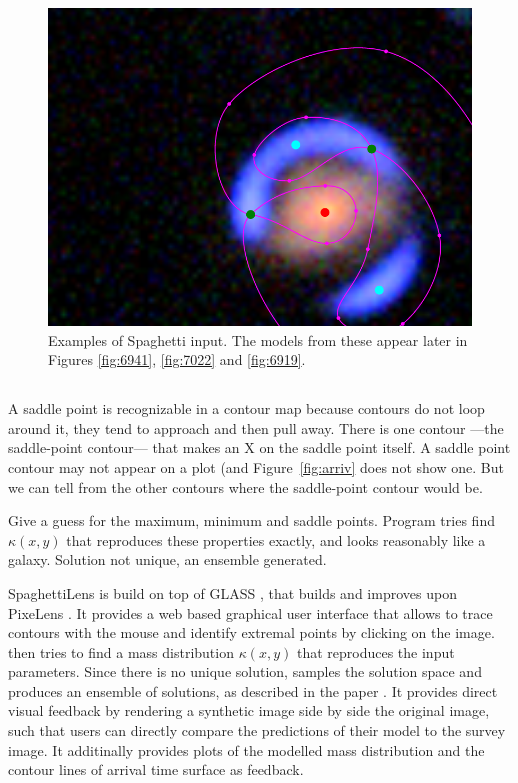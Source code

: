 \begin{figure}
\includegraphics[height=.3\vsize]{fig/spag6919.png}
\caption{Examples of Spaghetti input.  The models from these appear
  later in Figures \ref{fig:6941}, \ref{fig:7022} and
  \ref{fig:6919}. \label{fig:input-spag}}
\end{figure}

\subsection{\spl} \label{sec:SpaghettiLens}



A saddle point is recognizable in a contour map because contours do
not loop around it, they tend to approach and then pull away.  There
is one contour ---the saddle-point contour--- that makes an X on the
saddle point itself.  A saddle point contour may not appear on a plot
(and Figure~\ref{fig:arriv} does not show one.  But we can tell from
the other contours where the saddle-point contour would be.



Give a guess for the maximum, minimum and saddle points.  Program
tries find $\kappa(x,y)$ that reproduces these properties exactly, and
looks reasonably like a galaxy.  Solution not unique, an ensemble
generated.

\hr

SpaghettiLens is build on top of GLASS \citep{Lubini2012}, that builds and improves upon PixeLens \citep{Saha2004}.
It provides a web based graphical user interface that allows to trace contours with the mouse and identify extremal points by clicking on the image.
\spl then tries to find a mass distribution $\kappa(x,y)$ that reproduces the input parameters.
Since there is no unique solution, \spl samples the solution space and produces an ensemble of solutions, as described in the paper \citep{Lubini2012}.
It provides direct visual feedback by rendering a synthetic image side by side the original image, such that users can directly compare the predictions of their model to the survey image.
It additinally provides plots of the modelled mass distribution and the contour lines of arrival time surface as feedback. 

